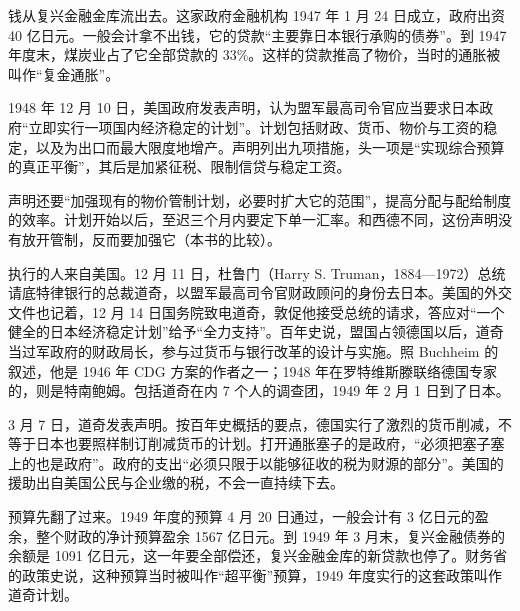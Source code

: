钱从复兴金融金库流出去。这家政府金融机构 1947 年 1 月 24 日成立，政府出资 40 亿日元\cite{mof2010}。一般会计拿不出钱，它的贷款“主要靠日本银行承购的债券”\cite{mof2010}。到 1947 年度末，煤炭业占了它全部贷款的 33\%\cite{mof2010}。这样的贷款推高了物价，当时的通胀被叫作“复金通胀”\cite{mof2010}。

1948 年 12 月 10 日，美国政府发表声明，认为盟军最高司令官应当要求日本政府“立即实行一项国内经济稳定的计划”\cite{frus1948jp}。计划包括财政、货币、物价与工资的稳定，以及为出口而最大限度地增产\cite{frus1948jp}。声明列出九项措施，头一项是“实现综合预算的真正平衡”，其后是加紧征税、限制信贷与稳定工资\cite{frus1948jp}。

声明还要“加强现有的物价管制计划，必要时扩大它的范围”，提高分配与配给制度的效率\cite{frus1948jp}。计划开始以后，至迟三个月内要定下单一汇率\cite{frus1948jp}。和西德不同，这份声明没有放开管制，反而要加强它（本书的比较）。

执行的人来自美国。12 月 11 日，杜鲁门（Harry S. Truman，1884—1972）总统请底特律银行的总裁道奇，以盟军最高司令官财政顾问的身份去日本\cite{boj1985,loc35}。美国的外交文件也记着，12 月 14 日国务院致电道奇，敦促他接受总统的请求，答应对“一个健全的日本经济稳定计划”给予“全力支持”\cite{frus1948jp}。百年史说，盟国占领德国以后，道奇当过军政府的财政局长，参与过货币与银行改革的设计与实施\cite{boj1985}。照 Buchheim 的叙述，他是 1946 年 CDG 方案的作者之一；1948 年在罗特维斯滕联络德国专家的，则是特南鲍姆\cite{buchheim1988}。包括道奇在内 7 个人的调查团，1949 年 2 月 1 日到了日本\cite{boj1985}。

3 月 7 日，道奇发表声明。按百年史概括的要点，德国实行了激烈的货币削减，不等于日本也要照样制订削减货币的计划\cite{boj1985}。打开通胀塞子的是政府，“必须把塞子塞上的也是政府”\cite{boj1985}。政府的支出“必须只限于以能够征收的税为财源的部分”\cite{boj1985}。美国的援助出自美国公民与企业缴的税，不会一直持续下去\cite{boj1985}。

预算先翻了过来。1949 年度的预算 4 月 20 日通过，一般会计有 3 亿日元的盈余，整个财政的净计预算盈余 1567 亿日元\cite{boj1985}。到 1949 年 3 月末，复兴金融债券的余额是 1091 亿日元，这一年要全部偿还，复兴金融金库的新贷款也停了\cite{boj1985,mof2010}。财务省的政策史说，这种预算当时被叫作“超平衡”预算，1949 年度实行的这套政策叫作道奇计划\cite{mof2010}。

